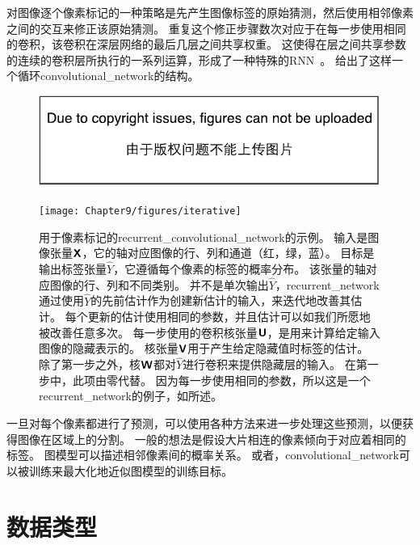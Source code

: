 对图像逐个像素标记的一种策略是先产生图像标签的原始猜测，然后使用相邻像素之间的交互来修正该原始猜测。
重复这个修正步骤数次对应于在每一步使用相同的卷积，该卷积在深层网络的最后几层之间共享权重\citep{jain2007supervised}。
这使得在层之间共享参数的连续的卷积层所执行的一系列运算，形成了一种特殊的\gls{RNN}~\citep{Pinheiro+Collobert-ICML2014,Pinheiro+Collobert-CVPR2015}。
给出了这样一个循环\gls{convolutional_network}的结构。
\begin{figure}[!htb]
\ifOpenSource
\centerline{\includegraphics{figure.pdf}}
\else
\centerline{\texttt{[image: Chapter9/figures/iterative]}}
\fi
\captionsetup{singlelinecheck=off}
\caption[.]{用于像素标记的\gls{recurrent_convolutional_network}的示例。
输入是图像张量$\textsf{\textbf{X}}$，它的轴对应图像的行、列和通道（红，绿，蓝）。
目标是输出标签张量$\hat{Y}$，它遵循每个像素的标签的概率分布。
该张量的轴对应图像的行、列和不同类别。
并不是单次输出$\hat{Y}$，\gls{recurrent_network}通过使用$\hat{Y}$的先前估计作为创建新估计的输入，来迭代地改善其估计。
每个更新的估计使用相同的参数，并且估计可以如我们所愿地被改善任意多次。
每一步使用的卷积核张量$\textsf{\textbf{U}}$，是用来计算给定输入图像的隐藏表示的。
核张量$\textsf{\textbf{V}}$用于产生给定隐藏值时标签的估计。
除了第一步之外，核$\textsf{\textbf{W}}$都对$\hat{Y}$进行卷积来提供隐藏层的输入。
在第一步中，此项由零代替。
因为每一步使用相同的参数，所以这是一个\gls{recurrent_network}的例子，如所述。}
\label{fig:chap9_iterative}
\end{figure}

 
一旦对每个像素都进行了预测，可以使用各种方法来进一步处理这些预测，以便获得图像在区域上的分割\citep{Briggman-et-al-NIPS2009,Turaga2010,Farabet-et-al-2013}。
一般的想法是假设大片相连的像素倾向于对应着相同的标签。
图模型可以描述相邻像素间的概率关系。
或者，\gls{convolutional_network}可以被训练来最大化地近似图模型的训练目标\citep{Ning-et-al-2005,Thompson-et-al-NIPS2014}。

\section{数据类型}
\label{sec:data_types}

